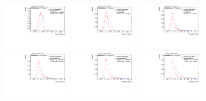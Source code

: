 \begin{figure}
\includegraphics[width=0.3\textwidth]{sascha_input/Appendix/Distributions/w/distributions/beta05/h_normal_tj_C2_05_bin5.pdf} \hspace{1mm}
\includegraphics[width=0.3\textwidth]{sascha_input/Appendix/Distributions/w/distributions/beta05/h_normal_tj_C2_05_bin6.pdf} 
\bigskip
\includegraphics[width=0.3\textwidth]{sascha_input/Appendix/Distributions/w/distributions/beta05/h_normal_tj_D2_05_bin1.pdf} \hspace{1mm}
\includegraphics[width=0.3\textwidth]{sascha_input/Appendix/Distributions/w/distributions/beta05/h_normal_tj_D2_05_bin2.pdf} \hspace{1mm}
\includegraphics[width=0.3\textwidth]{sascha_input/Appendix/Distributions/w/distributions/beta05/h_normal_tj_D2_05_bin3.pdf} 
\bigskip
\includegraphics[width=0.3\textwidth]{sascha_input/Appendix/Distributions/w/distributions/beta05/h_normal_tj_D2_05_bin4.pdf} \hspace{1mm}

\end{figure}

